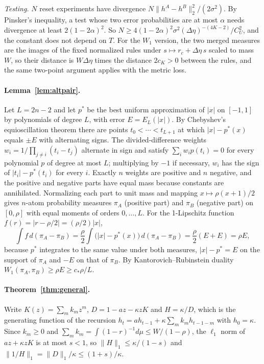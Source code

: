 \emph{Testing.} $N$ reset experiments have divergence $N\|h^A-h^B\|_2^2/(2\sigma^2)$. By Pinsker's inequality, a test whose two error probabilities are at most $\alpha$ needs divergence at least $2(1-2\alpha)^2$. So $N\ge4(1-2\alpha)^2\sigma^2(\Delta\eta)^{-(4K-2)}/C_U^2$, and the constant does not depend on $T$. For the $W_1$ version, the two merged measures are the images of the fixed normalized rules under $s\mapsto r_c+\Delta\eta\,s$ scaled to mass $W$, so their distance is $W\Delta\eta$ times the distance $2c_K>0$ between the rules, and the same two-point argument applies with the metric loss.

\paragraph{Lemma~\ref{lem:altpair}.} Let $L=2n-2$ and let $p^*$ be the best uniform approximation of $|x|$ on $[-1,1]$ by polynomials of degree $L$, with error $E=E_L(|x|)$. By Chebyshev's equioscillation theorem \citep{rivlin1981} there are points $t_0<\cdots<t_{L+1}$ at which $|x|-p^*(x)$ equals $\pm E$ with alternating signs. The divided-difference weights $w_i=1/\prod_{j\ne i}(t_i-t_j)$ alternate in sign and satisfy $\sum_iw_ip(t_i)=0$ for every polynomial $p$ of degree at most $L$; multiplying by $-1$ if necessary, $w_i$ has the sign of $|t_i|-p^*(t_i)$ for every $i$. Exactly $n$ weights are positive and $n$ negative, and the positive and negative parts have equal mass because constants are annihilated. Normalizing each part to unit mass and mapping $x\mapsto\rho(x+1)/2$ gives $n$-atom probability measures $\pi_A$ (positive part) and $\pi_B$ (negative part) on $[0,\rho]$ with equal moments of orders $0,\ldots,L$. For the 1-Lipschitz function $f(r)=|r-\rho/2|=(\rho/2)|x|$,
\[
\int f\,d(\pi_A-\pi_B)=\frac\rho2\int\bigl(|x|-p^*(x)\bigr)\,d(\pi_A-\pi_B)=\frac\rho2(E+E)=\rho E ,
\]
because $p^*$ integrates to the same value under both measures, $|x|-p^*=E$ on the support of $\pi_A$ and $-E$ on that of $\pi_B$. By Kantorovich--Rubinstein duality $W_1(\pi_A,\pi_B)\ge\rho E\ge c_*\rho/L$.

\paragraph{Theorem~\ref{thm:general}.} Write $K(z)=\sum_mk_mz^m$, $D=1-az-\kappa zK$ and $H=\kappa/D$, which is the generating function of the recursion $h_t=ah_{t-1}+\kappa\sum_mk_mh_{t-1-m}$ with $h_0=\kappa$. Since $k_m\ge0$ and $\sum_mk_m=\int(1-r)^{-1}d\mu\le W/(1-\rho)$, the $\ell_1$ norm of $az+\kappa zK$ is at most $s<1$, so $\|H\|_1\le\kappa/(1-s)$ and $\|1/H\|_1=\|D\|_1/\kappa\le(1+s)/\kappa$.

